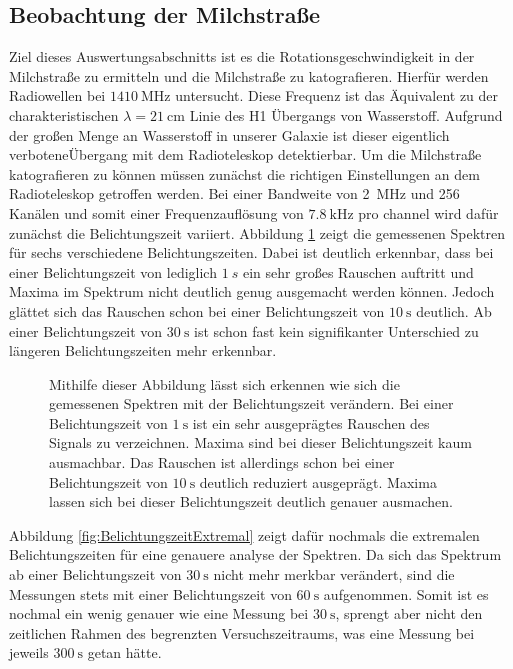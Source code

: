 \subsection{Beobachtung der Milchstraße}
Ziel dieses Auswertungsabschnitts ist es die Rotationsgeschwindigkeit in der Milchstraße zu ermitteln und die Milchstraße zu katografieren.\newline
Hierfür werden Radiowellen bei $\SI{1410}{\mega \hertz}$ untersucht. Diese Frequenz ist das Äquivalent zu der charakteristischen $\lambda = \SI{21}{\centi \metre}$ Linie des H1 Übergangs von Wasserstoff. Aufgrund der großen Menge an Wasserstoff in unserer Galaxie ist dieser eigentlich \dq verbotene\dq  Übergang mit dem Radioteleskop detektierbar.\newline
Um die Milchstraße katografieren zu können müssen zunächst die richtigen Einstellungen an dem Radioteleskop getroffen werden. Bei einer Bandweite von \SI{2}{MHz} und 256 Kanälen und somit einer Frequenzauflösung von $\SI{7.8}{\kilo \hertz}$ pro channel \cite{Usermanual} wird dafür zunächst die Belichtungszeit variiert. Abbildung \ref{fig:Belichtungszeit} zeigt die gemessenen Spektren für sechs verschiedene Belichtungszeiten. Dabei ist deutlich erkennbar, dass bei einer Belichtungszeit von lediglich $\SI{1}{s}$ ein sehr großes Rauschen auftritt und Maxima im Spektrum nicht deutlich genug ausgemacht werden können. Jedoch glättet sich das Rauschen schon bei einer Belichtungszeit von $\SI{10}{\second}$ deutlich. Ab einer Belichtungszeit von $\SI{30}{\second}$ ist schon fast kein signifikanter Unterschied zu längeren Belichtungszeiten mehr erkennbar.
\begin{figure}[H]
    \centering
       
    \caption[Gemessenen Spektren bei verschiedenen Belichtungszeiten]{Mithilfe dieser Abbildung lässt sich erkennen wie sich die gemessenen Spektren mit der Belichtungszeit verändern. Bei einer Belichtungszeit von $\SI{1}{\second}$ ist ein sehr ausgeprägtes Rauschen des Signals zu verzeichnen. Maxima sind bei dieser Belichtungszeit kaum ausmachbar. Das Rauschen ist allerdings schon bei einer Belichtungszeit von $\SI{10}{\second}$ deutlich reduziert ausgeprägt. Maxima lassen sich bei dieser Belichtungszeit deutlich genauer ausmachen.}
    \label{fig:Belichtungszeit}
\end{figure}
Abbildung \ref{fig:BelichtungszeitExtremal} zeigt dafür nochmals die extremalen Belichtungszeiten für eine genauere analyse der Spektren. Da sich das Spektrum ab einer Belichtungszeit von $\SI{30}{\second}$ nicht mehr merkbar verändert, sind die Messungen stets mit einer Belichtungszeit von $\SI{60}{\second}$ aufgenommen. Somit ist es nochmal ein wenig genauer wie eine Messung bei $\SI{30}{\second}$, sprengt aber nicht den zeitlichen Rahmen des begrenzten Versuchszeitraums, was eine Messung bei jeweils $\SI{300}{\second}$ getan hätte.

